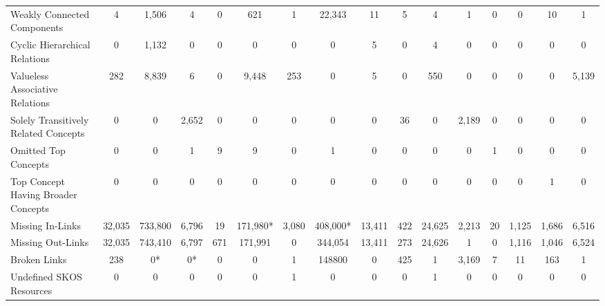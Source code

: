 \begin{table}[h]
\begin{center}
{\begin{tabular}{lccccccccccccccc}
Weakly Connected Components & 4 & 1,506 & 4 & 0 & 621 & 1 & 22,343 & 11 & 5 & 4 & 1 & 0 & 0 & 10 & 1 \\

Cyclic Hierarchical Relations & 0 & 1,132 & 0 & 0 & 0 & 0 & 0 & 5 & 0 & 4 & 0 & 0 & 0 & 0 & 0 \\

Valueless Associative Relations & 282 & 8,839 & 6 & 0 & 9,448 & 253 & 0 & 5 & 0 & 550 & 0 & 0 & 0 & 0 & 5,139 \\

Solely Transitively Related Concepts & 0 & 0 & 2,652 & 0 & 0 & 0 & 0 & 0 & 36 & 0 & 2,189 & 0 & 0 & 0 & 0 \\

Omitted Top Concepts & 0 & 0 & 1 & 9 & 9 & 0 & 1 & 0 & 0 & 0 & 0 & 1 & 0 & 0 & 0 \\

Top Concept Having Broader Concepts & 0 & 0 & 0 & 0 & 0 & 0 & 0 & 0 & 0 & 0 & 0 & 0 & 0 & 1 & 0 \\

\midrule

Missing In-Links & 32,035 & 733,800 & 6,796 & 19 & 171,980* & 3,080 & 408,000* & 13,411 & 422 & 24,625 & 2,213 & 20 & 1,125 & 1,686 & 6,516 \\

Missing Out-Links & 32,035 & 743,410 & 6,797 & 671 & 171,991 & 0 & 344,054 & 13,411 & 273 & 24,626 & 1 & 0 & 1,116 & 1,046 & 6,524 \\

Broken Links & 238 & 0* & 0* & 0 & 0 & 1 & 148800 & 0 & 425 & 1 & 3,169 & 7 & 11 & 163 & 1 \\

Undefined SKOS Resources & 0 & 0 & 0 & 0 & 0 & 1 & 0 & 0 & 0 & 1 & 0 & 0 & 0 & 0 & 0 \\

\bottomrule
\end{tabular}
}
\end{center}
\end{table}

